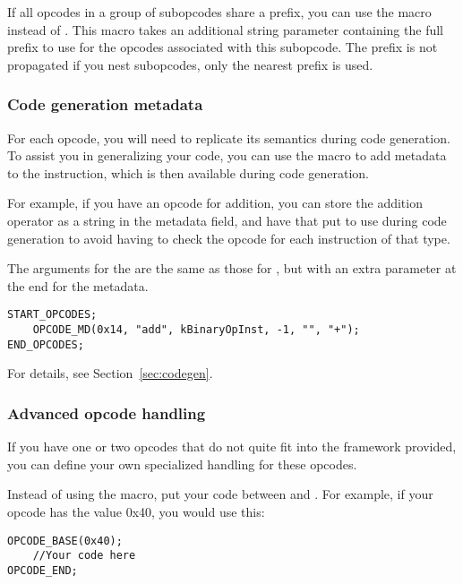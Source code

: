 If all opcodes in a group of subopcodes share a prefix, you can use the  macro instead of . This macro takes an additional string parameter containing the full prefix to use for the opcodes associated with this subopcode. The prefix is not propagated if you nest subopcodes, only the nearest prefix is used.

\subsubsection{Code generation metadata}
For each opcode, you will need to replicate its semantics during code generation. To assist you in generalizing your code, you can use the  macro to add metadata to the instruction, which is then available during code generation.

For example, if you have an opcode for addition, you can store the addition operator as a string in the metadata field, and have that put to use during code generation to avoid having to check the opcode for each instruction of that type.

The arguments for the  are the same as those for , but with an extra parameter at the end for the metadata.

\begin{C++}
\begin{lstlisting}
START_OPCODES;
	OPCODE_MD(0x14, "add", kBinaryOpInst, -1, "", "+");
END_OPCODES;
\end{lstlisting}
\end{C++}

For details, see Section~\vref{sec:codegen}.

\subsubsection{Advanced opcode handling}
If you have one or two opcodes that do not quite fit into the framework provided, you can define your own specialized handling for these opcodes.

Instead of using the  macro, put your code between  and . For example, if your opcode has the value 0x40, you would use this:

\begin{C++}
\begin{lstlisting}
OPCODE_BASE(0x40);
	//Your code here
OPCODE_END;
\end{lstlisting}
\end{C++}

